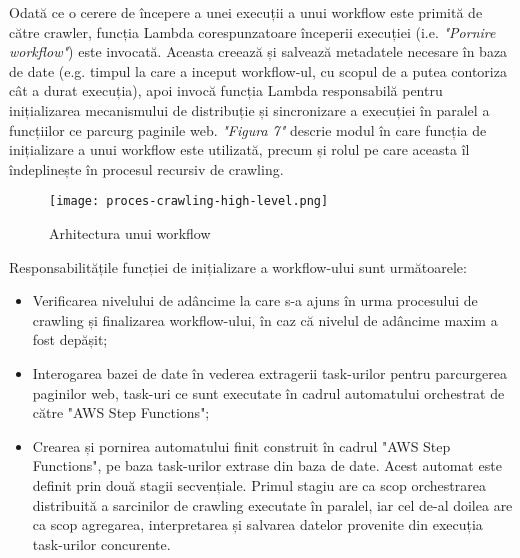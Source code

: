 Odată ce o cerere de începere a unei execuții a unui workflow este primită de către crawler, funcția Lambda corespunzatoare începerii execuției (i.e. \textit{"Pornire workflow"}) este invocată. Aceasta creează și salvează metadatele necesare în baza de date (e.g. timpul la care a inceput workflow-ul, cu scopul de a putea contoriza cât a durat execuția), apoi invocă funcția Lambda responsabilă pentru inițializarea mecanismului de distribuție și sincronizare a execuției în paralel a funcțiilor ce parcurg paginile web. \textit{"Figura 7"} descrie modul în care funcția de inițializare a unui workflow este utilizată, precum și rolul pe care aceasta îl îndeplinește în procesul recursiv de crawling.

\begin{figure}[ht]
\begin{center}
	\texttt{[image: proces-crawling-high-level.png]}
	\caption{Arhitectura unui workflow \cite{diagram-icons-sources, aws-icons-source}}\par\medskip 

\end{center}
\end{figure}

\noindent
Responsabilitățile funcției de inițializare a workflow-ului sunt următoarele:

\begin{itemize}
	\item{Verificarea nivelului de adâncime la care s-a ajuns în urma procesului de crawling și finalizarea workflow-ului, în caz că nivelul de adâncime maxim a fost depășit;}
	\item{Interogarea bazei de date în vederea extragerii task-urilor pentru parcurgerea paginilor web, task-uri ce sunt executate în cadrul automatului orchestrat de către "AWS Step Functions";}
	\item{Crearea și pornirea automatului finit construit în cadrul "AWS Step Functions", pe baza task-urilor extrase din baza de date. Acest automat este definit prin două stagii secvențiale. Primul stagiu are ca scop orchestrarea distribuită a sarcinilor de crawling executate în paralel, iar cel de-al doilea are ca scop agregarea, interpretarea și salvarea datelor provenite din execuția task-urilor concurente.}
\end{itemize}
